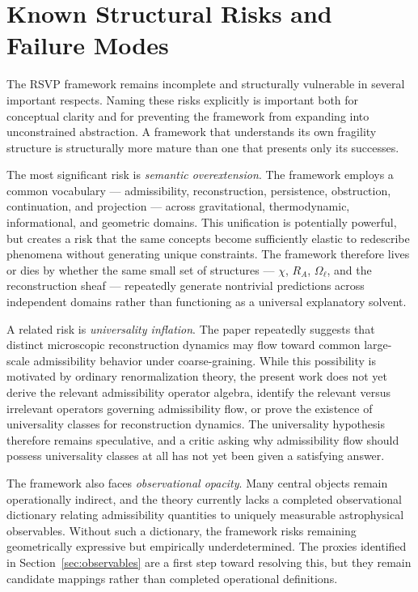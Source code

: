 \documentclass[11pt, a4paper]{article}
\theoremstyle{plain}
\theoremstyle{definition}
\theoremstyle{remark}
\newcommand{\RA}{R_{\!A}}
\begin{document}
\section{Known Structural Risks and Failure Modes}
\label{sec:risks}

The RSVP framework remains incomplete and structurally vulnerable in several
important respects. Naming these risks explicitly is important both for conceptual
clarity and for preventing the framework from expanding into unconstrained
abstraction. A framework that understands its own fragility structure is structurally
more mature than one that presents only its successes.

The most significant risk is \emph{semantic overextension}. The framework employs a
common vocabulary --- admissibility, reconstruction, persistence, obstruction,
continuation, and projection --- across gravitational, thermodynamic, informational,
and geometric domains. This unification is potentially powerful, but creates a risk
that the same concepts become sufficiently elastic to redescribe phenomena without
generating unique constraints. The framework therefore lives or dies by whether the
same small set of structures --- $\chi$, $\RA$, $\Omega_\ell$, and the reconstruction
sheaf --- repeatedly generate nontrivial predictions across independent domains rather
than functioning as a universal explanatory solvent.

A related risk is \emph{universality inflation}. The paper repeatedly suggests that
distinct microscopic reconstruction dynamics may flow toward common large-scale
admissibility behavior under coarse-graining. While this possibility is motivated by
ordinary renormalization theory, the present work does not yet derive the relevant
admissibility operator algebra, identify the relevant versus irrelevant operators
governing admissibility flow, or prove the existence of universality classes for
reconstruction dynamics. The universality hypothesis therefore remains speculative,
and a critic asking why admissibility flow should possess universality classes at all
has not yet been given a satisfying answer.

The framework also faces \emph{observational opacity}. Many central objects remain
operationally indirect, and the theory currently lacks a completed observational
dictionary relating admissibility quantities to uniquely measurable astrophysical
observables. Without such a dictionary, the framework risks remaining geometrically
expressive but empirically underdetermined. The proxies identified in
Section~\ref{sec:observables} are a first step toward resolving this, but they remain
candidate mappings rather than completed operational definitions.
\end{document}
